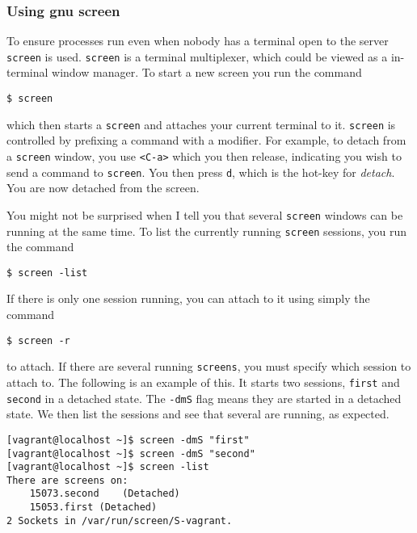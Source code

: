 \subsubsection{Using gnu screen}\label{using-gnu-screen}

To ensure processes run even when nobody has a terminal open to the
server \texttt{screen} is used. \texttt{screen} is a terminal
multiplexer, which could be viewed as a in-terminal window manager. To
start a new screen you run the command

\begin{verbatim}
$ screen
\end{verbatim}

which then starts a \texttt{screen} and attaches your current terminal
to it. \texttt{screen} is controlled by prefixing a command with a
modifier. For example, to detach from a \texttt{screen} window, you use
\texttt{\textless{}C-a\textgreater{}} which you then release, indicating
you wish to send a command to \texttt{screen}. You then press
\texttt{d}, which is the hot-key for \emph{detach}. You are now detached
from the screen.

You might not be surprised when I tell you that several \texttt{screen}
windows can be running at the same time. To list the currently running
\texttt{screen} sessions, you run the command

\begin{verbatim}
$ screen -list
\end{verbatim}

If there is only one session running, you can attach to it using simply
the command

\begin{verbatim}
$ screen -r
\end{verbatim}

to attach. If there are several running \texttt{screens}, you must
specify which session to attach to. The following is an example of this.
It starts two sessions, \texttt{first} and \texttt{second} in a detached
state. The \texttt{-dmS} flag means they are started in a detached
state. We then list the sessions and see that several are running, as
expected.

\begin{verbatim}
[vagrant@localhost ~]$ screen -dmS "first"
[vagrant@localhost ~]$ screen -dmS "second"
[vagrant@localhost ~]$ screen -list
There are screens on:
    15073.second    (Detached)
    15053.first (Detached)
2 Sockets in /var/run/screen/S-vagrant.
\end{verbatim}

